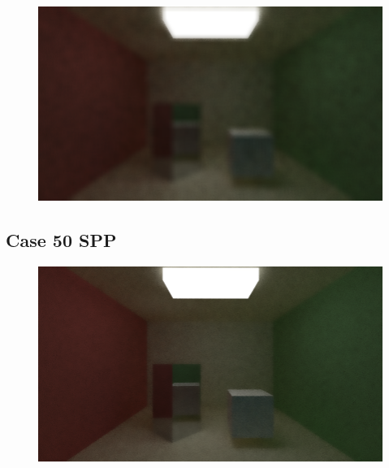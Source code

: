 \documentclass[titlepage,12pt]{report}
\begin{document}
\begin{appendices}
\begin{figure}[H]
	\centering
	\includegraphics[scale=0.5]{media/bilateral/cornell_normal_10_bilateral_filter_21_15_60.png}
	\label{ap28}
\end{figure}

\subsection{Case 50 SPP}

\begin{figure}[H]
	\centering
	\includegraphics[scale=0.5]{media/bilateral/cornell_normal_50_bilateral_filter_21_5_10.png}
	\label{ap29}
\end{figure}


\end{appendices}
\end{document}
